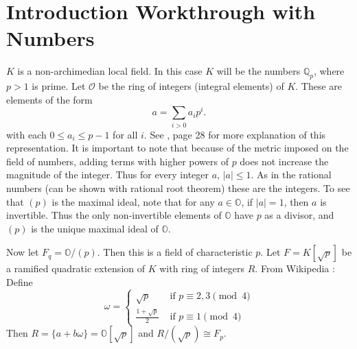 
\section{Introduction Workthrough with \padic Numbers}
$K$ is a non-archimedian local field. In this case $K$ will be the \padic numbers $\mathbb{Q}_p$, where $p > 1$ is prime.
Let 	$\mathcal{O}$ be the ring of integers (integral elements) of $K$. These are elements of the form
\[
a = \sum_{i > 0}a_i p^i.
\]
with each $0 \le a_i \le p - 1$ for all $i$. See \cite{katok}, page 28 for more explanation of this representation.
It is important to note that because of the metric imposed on the field of \padic numbers, adding terms with higher powers of $p$ does not increase the magnitude of the integer.
Thus for every \padic integer $a$, $|a| \le 1$.
As in the rational numbers (can be shown with rational root theorem) these are the integers.
To see that $(p)$ is the maximal ideal, note that for any $a \in \mathbb{O}$, if $|a| = 1$, then $a$ is invertible.
Thus the only non-invertible elements of $\mathbb{O}$ have $p$ as a divisor, and $(p)$ is the unique maximal ideal of $\mathbb{O}$.

Now let $F_q = \mathbb{O}/(p)$. Then this is a field of characteristic $p$.
Let $F = K[\sqrt{p}]$ be a ramified quadratic extension of $K$ with ring of integers $R$.
From Wikipedia \cite{wikipedia:quadratic-integer}: Define
\[
\omega = \begin{cases}
\sqrt{p} &\text{ if } p \equiv 2,3 \pmod{4}\\
\frac{1 + \sqrt{p}}{2} &\text{ if } p \equiv 1 \pmod{4}
\end{cases}
\]
Then $R = \{a + b \omega \} = \mathbb{O}[\sqrt{p}]$ and $R/(\sqrt{p}) \cong F_p$.
